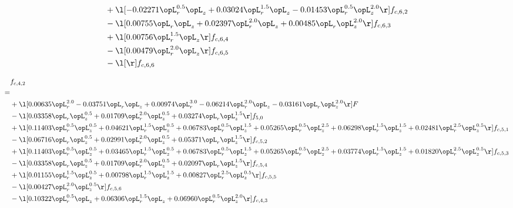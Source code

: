 \begin{alignat}{2}
& + \l[  -0.02271 \opL_r^{0.5} \opL_z +  0.03024 \opL_r^{1.5} \opL_z   -0.01453 \opL_r^{0.5} \opL_z^{2.0}  \r] f_{c,6,2} \nonumber \\ 
& - \l[  0.00755 \opL_r \opL_z +  0.02397 \opL_r^{2.0} \opL_z +  0.00485 \opL_r \opL_z^{2.0}  \r] f_{c,6,3} \nonumber \\ 
& + \l[  0.00756 \opL_r^{1.5} \opL_z  \r] f_{c,6,4} \nonumber \\ 
& - \l[  0.00479 \opL_r^{2.0} \opL_z  \r] f_{c,6,5} \nonumber \\ 
& - \l[  \r] f_{c,6,6} \nonumber \\ 
\end{alignat} 


\begin{alignat}{2} 
\label{eq:f_42_2} 
& f_{c,4,2} \nonumber \\ 
 = \\ 
& + \l[  0.00635 \opL_r^{2.0}   -0.03751 \opL_r \opL_z +  0.00974 \opL_r^{3.0}   -0.06214 \opL_r^{2.0} \opL_z   -0.03161 \opL_r \opL_z^{2.0}  \r] F \nonumber \\ 
& - \l[  0.03358 \opL_r \opL_z^{0.5} +  0.01709 \opL_r^{2.0} \opL_z^{0.5} +  0.03274 \opL_r \opL_z^{1.5}  \r] f_{5,0} \nonumber \\ 
& + \l[  0.11403 \opL_r^{0.5} \opL_z^{0.5} +  0.04621 \opL_r^{1.5} \opL_z^{0.5} +  0.06783 \opL_r^{0.5} \opL_z^{1.5} +  0.05265 \opL_r^{0.5} \opL_z^{2.5} +  0.06298 \opL_r^{1.5} \opL_z^{1.5} +  0.02481 \opL_r^{2.5} \opL_z^{0.5}  \r] f_{c,5,1} \nonumber \\ 
& - \l[  0.06716 \opL_r \opL_z^{0.5} +  0.02991 \opL_r^{2.0} \opL_z^{0.5} +  0.05371 \opL_r \opL_z^{1.5}  \r] f_{c,5,2} \nonumber \\ 
& + \l[  0.11403 \opL_r^{0.5} \opL_z^{0.5} +  0.03465 \opL_r^{1.5} \opL_z^{0.5} +  0.06783 \opL_r^{0.5} \opL_z^{1.5} +  0.05265 \opL_r^{0.5} \opL_z^{2.5} +  0.03774 \opL_r^{1.5} \opL_z^{1.5} +  0.01820 \opL_r^{2.5} \opL_z^{0.5}  \r] f_{c,5,3} \nonumber \\ 
& - \l[  0.03358 \opL_r \opL_z^{0.5} +  0.01709 \opL_r^{2.0} \opL_z^{0.5} +  0.02097 \opL_r \opL_z^{1.5}  \r] f_{c,5,4} \nonumber \\ 
& + \l[  0.01155 \opL_r^{1.5} \opL_z^{0.5} +  0.00798 \opL_r^{1.5} \opL_z^{1.5} +  0.00827 \opL_r^{2.5} \opL_z^{0.5}  \r] f_{c,5,5} \nonumber \\ 
& - \l[  0.00427 \opL_r^{2.0} \opL_z^{0.5}  \r] f_{c,5,6} \nonumber \\ 
& - \l[  0.10322 \opL_r^{0.5} \opL_z +  0.06306 \opL_r^{1.5} \opL_z +  0.06960 \opL_r^{0.5} \opL_z^{2.0}  \r] f_{c,4,3} \nonumber \\ 

\end{alignat}
